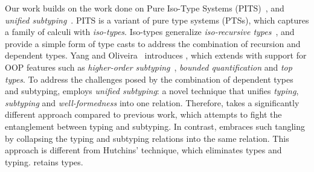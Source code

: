 Our work builds on the work done on Pure Iso-Type Systems (PITS)~\cite{???}, and
\emph{unified subtyping}~\cite{full}. PITS is a variant of pure type systems (PTSs),
which captures a family of calculi with \emph{iso-types}. Iso-types generalize \emph{iso-recursive
types}~\cite{tapl}, and provide a simple form of
type casts to address the combination of recursion and
dependent types. 
Yang and Oliveira~\cite{full} introduces \name, which extends 
\lami with support for OOP features such as
\emph{higher-order subtyping}~\cite{fsubo}, \emph{bounded quantification} and
\emph{top types}. 
To address the challenges posed by
the combination of dependent types and subtyping, \name
employs \emph{unified subtyping}: a novel technique that unifies
\emph{typing}, \emph{subtyping} and \emph{well-formedness} into one
relation. Therefore, \name takes a significantly different
approach compared to previous work, which
attempts to fight the entanglement between typing and subtyping. In
contrast, \name embraces such
tangling by collapsing the typing and subtyping
relations into the same relation.  This approach is different from
Hutchins' technique, which eliminates types and typing. \name
retains types. 



